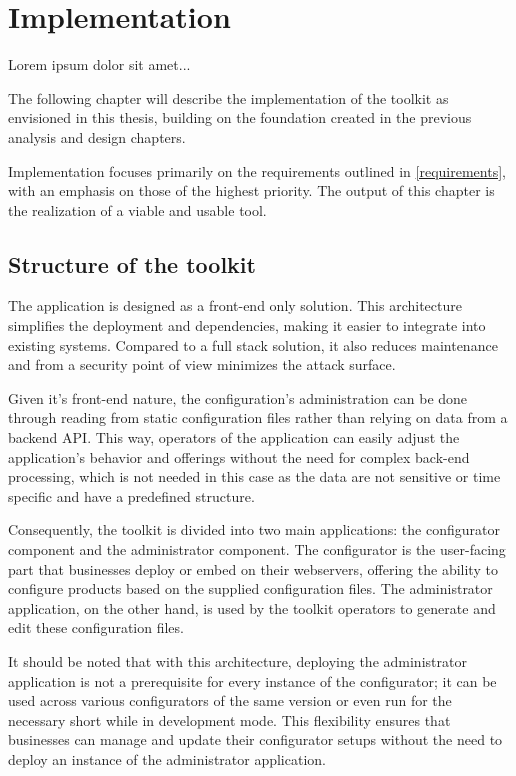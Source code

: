 \chapter{Implementation}

\begin{chapterabstract}
Lorem ipsum dolor sit amet...
\end{chapterabstract}

The following chapter will describe the implementation of the toolkit as envisioned in this thesis, building on the foundation created in the previous analysis and design chapters. 

Implementation focuses primarily on the requirements outlined in \autoref{requirements}, with an emphasis on those of the highest priority. The output of this chapter is the realization of a viable and usable tool.

\section{Structure of the toolkit}

The application is designed as a front-end only solution. This architecture simplifies the deployment and dependencies, making it easier to integrate into existing systems. Compared to a full stack solution, it also reduces maintenance and from a security point of view minimizes the attack surface. 

Given it's front-end nature, the configuration's administration can be done through reading from static configuration files rather than relying on data from a backend API. This way, operators of the application can easily adjust the application's behavior and offerings without the need for complex back-end processing, which is not needed in this case as the data are not sensitive or time specific and have a predefined structure. 

Consequently, the toolkit is divided into two main applications: the configurator component and the administrator component. The configurator is the user-facing part that businesses deploy or embed on their webservers, offering the ability to configure products based on the supplied configuration files. The administrator application, on the other hand, is used by the toolkit operators to generate and edit these configuration files.

It should be noted that with this architecture, deploying the administrator application is not a prerequisite for every instance of the configurator; it can be used across various configurators of the same version or even run for the necessary short while in development mode. This flexibility ensures that businesses can manage and update their configurator setups without the need to deploy an instance of the administrator application.

